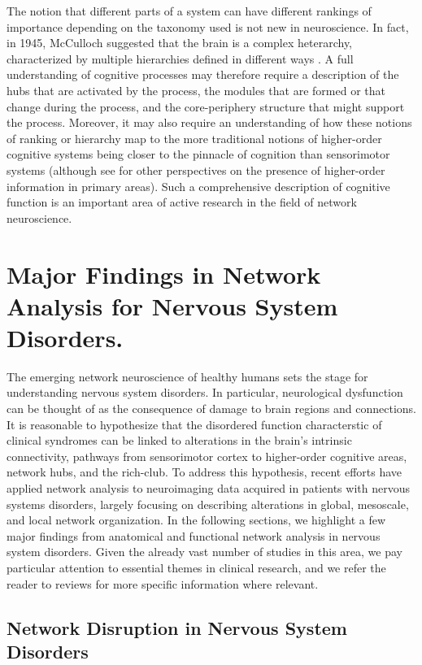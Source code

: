 \documentclass[12pt]{article}
\begin{document}
The notion that different parts of a system can have different rankings of importance depending on the taxonomy used is not new in neuroscience. In fact, in 1945, McCulloch suggested that the brain is a complex heterarchy, characterized by multiple hierarchies defined in different ways \cite{McCulloch1945}. A full understanding of cognitive processes may therefore require a description of the hubs that are activated by the process, the modules that are formed or that change during the process, and the core-periphery structure that might support the process. Moreover, it may also require an understanding of how these notions of ranking or hierarchy map to the more traditional notions of higher-order cognitive systems being closer to the pinnacle of cognition than sensorimotor systems \cite{sepulcre2012,sepulcre2014} (although see \cite{persichetti2015value} for other perspectives on the presence of higher-order information in primary areas). Such a comprehensive description of cognitive function is an important area of active research in the field of network neuroscience.


\section*{Major Findings in Network Analysis for Nervous System Disorders.}

The emerging network neuroscience of healthy humans sets the stage for understanding nervous system disorders. In particular, neurological dysfunction can be thought of as the consequence of damage to brain regions and connections. It is reasonable to hypothesize that the disordered function characterstic of clinical syndromes can be linked to alterations in the brain's intrinsic connectivity, pathways from sensorimotor cortex to higher-order cognitive areas, network hubs, and the rich-club. To address this hypothesis, recent efforts have applied network analysis to neuroimaging data acquired in patients with nervous systems disorders, largely focusing on describing alterations in global, mesoscale, and local network organization. In the following sections, we highlight a few major findings from anatomical and functional network analysis in nervous system disorders. Given the already vast number of studies in this area, we pay particular attention to essential themes in clinical research, and we refer the reader to reviews for more specific information where relevant.


\subsection*{Network Disruption in Nervous System Disorders}
\end{document}
